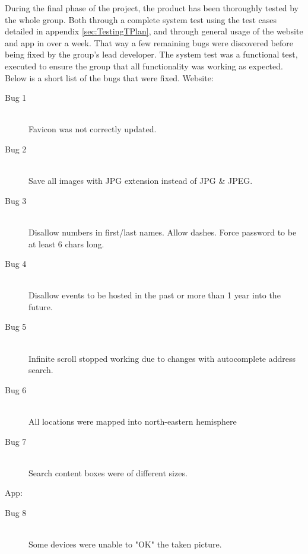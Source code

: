 During the final phase of the project, the product has been thoroughly tested by the whole group. Both through a complete system test using the test cases detailed in appendix \ref{sec:TestingTPlan}, and through general usage of the website and app in over a week. That way a few remaining bugs were discovered before being fixed by the group’s lead developer. The system test was a functional test, executed to ensure the group that all functionality was working as expected. Below is a short list of the bugs that were fixed. 
\medskip
Website: 
\begin{description}
  \item[Bug 1] \hfill \\
  Favicon was not correctly updated.
  \item[Bug 2] \hfill \\
  Save all images with JPG extension instead of JPG \& JPEG.
  \item[Bug 3] \hfill \\
  Disallow numbers in first/last names. Allow dashes. Force password to be at least 6 chars long.
  \item[Bug 4] \hfill \\
  Disallow events to be hosted in the past or more than 1 year into the future.
  \item[Bug 5] \hfill \\
  Infinite scroll stopped working due to changes with autocomplete address search.
  \item[Bug 6] \hfill \\
  All locations were mapped into north-eastern hemisphere
  \item[Bug 7] \hfill \\
  Search content boxes were of different sizes.
\end{description}
\medskip
App: 
\begin{description}
  \item[Bug 8] \hfill \\
  Some devices were unable to "OK" the taken picture.
\end{description}
%
